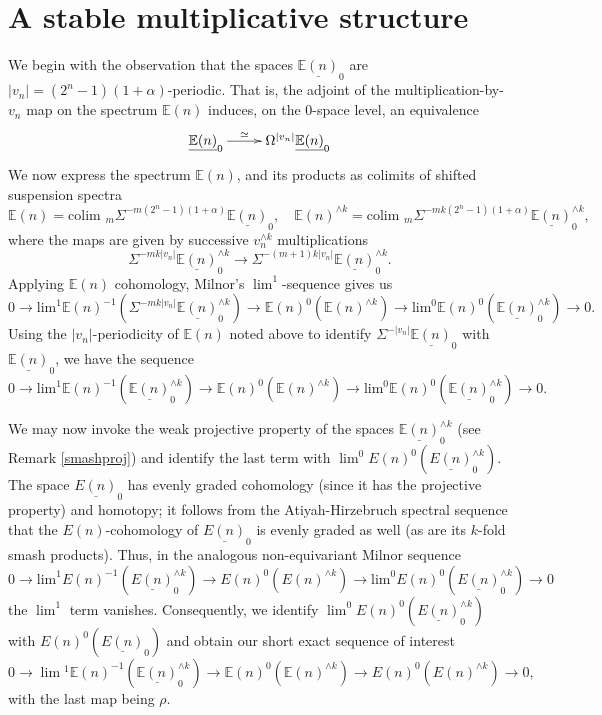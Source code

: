 \documentclass[12pt]{amsart}
\numberwithin{equation}{section}
\theoremstyle{plain}  %
\theoremstyle{definition}  %
\newcommand{\colim}{\text{colim }}
\newcommand{\E}{\mathbb{E}}
\renewcommand{\sp}[2]{\underline{#1}_{#2}}
\begin{document}
\section{A stable multiplicative structure}
\medskip

We begin with the observation that the spaces $\underline{\E(n)}_0$ are $|v_n|=(2^n-1)(1+\alpha)$-periodic. That is, the adjoint of the multiplication-by-$v_n$ map on the spectrum $\E(n)$ induces, on the 0-space level, an equivalence
$$\xymatrix{
\sp{\E(n)}{0} \ar@{->}[r]^-{\simeq} & \Omega^{|v_n|}\sp{\E(n)}{0}
}$$
 We now express the spectrum $\E(n)$, and its products as colimits of shifted suspension spectra
\[ \E(n) = \colim_m \Sigma^{-m(2^n-1)(1+\alpha)} \underline{\E(n)}_0, \quad \E(n)^{\wedge k} = \colim_m \Sigma^{-mk(2^n-1)(1+\alpha)} \underline{\E(n)}_0^{\wedge k},  \]
where the maps are given by successive $v_n^{\wedge k}$ multiplications 
\[ \Sigma^{-mk|v_n|} \underline{\E(n)}_0^{\wedge k} \longrightarrow \Sigma^{-(m+1)k|v_n|}\underline{\E(n)}_0^{\wedge k}.\]
Applying $\E(n)$ cohomology, Milnor's $\lim^1$-sequence gives us
\[ 0 \longrightarrow \text{lim}^1 \E(n)^{-1}(\Sigma^{-mk|v_n|}\sp{\E(n)}{0}^{\wedge k}) \longrightarrow \E(n)^0(\E(n)^{\wedge k}) \longrightarrow \text{lim}^0 \E(n)^0(\sp{\E(n)}{0}^{\wedge k}) \longrightarrow 0.\]
Using the $|v_n|$-periodicity of $\E(n)$ noted above to identify $\Sigma^{-|v_n|}\underline{\E(n)}_0$ with $\underline{\E(n)}_0$, we have the sequence
\[ 0 \longrightarrow \text{lim}^{1} \E(n)^{-1} (\underline{\E(n)}_0^{\wedge k}) \longrightarrow \E(n)^0(\E(n)^{\wedge k}) \longrightarrow \text{lim}^0 \E(n)^0(\underline{\E(n)}_0^{\wedge k}) \longrightarrow 0. \] 


\medskip
\noindent
We may now invoke the weak projective property of the spaces $\underline{\E(n)}_0^{\wedge k}$ (see Remark \ref{smashproj}) and identify the last term with $\lim^0 E(n)^0(\underline{E(n)}_0^{\wedge k})$. The space $\sp{E(n)}{0}$ has evenly graded cohomology (since it has the projective property) and homotopy; it follows from the Atiyah-Hirzebruch spectral sequence that the $E(n)$-cohomology of $\sp{E(n)}{0}$ is evenly graded as well (as are its $k$-fold smash products). Thus, in the analogous non-equivariant Milnor sequence 
\[ 0 \longrightarrow \text{lim}^{1} E(n)^{-1} (\underline{E(n)}_0^{\wedge k}) \longrightarrow E(n)^0(E(n)^{\wedge k}) \longrightarrow \text{lim}^0 E(n)^0(\underline{E(n)}_0^{\wedge k}) \longrightarrow 0 \] 
the $\lim^1$ term vanishes. Consequently, we identify $\lim^0E(n)^0(\underline{E(n)}_0^{\wedge k})$ with $E(n)^0(\sp{E(n)}{0})$ and obtain our short exact sequence of interest 
\begin{equation}\label{ses1} 0 \longrightarrow \lim{}^1 \E(n)^{-1} (\underline{\E(n)}_0^{\wedge k})  \longrightarrow \E(n)^0(\E(n)^{\wedge k}) \longrightarrow E(n)^0(E(n)^{\wedge k}) \longrightarrow 0,\end{equation}
with the last map being $\rho$. 
\medskip
\noindent
\end{document}
